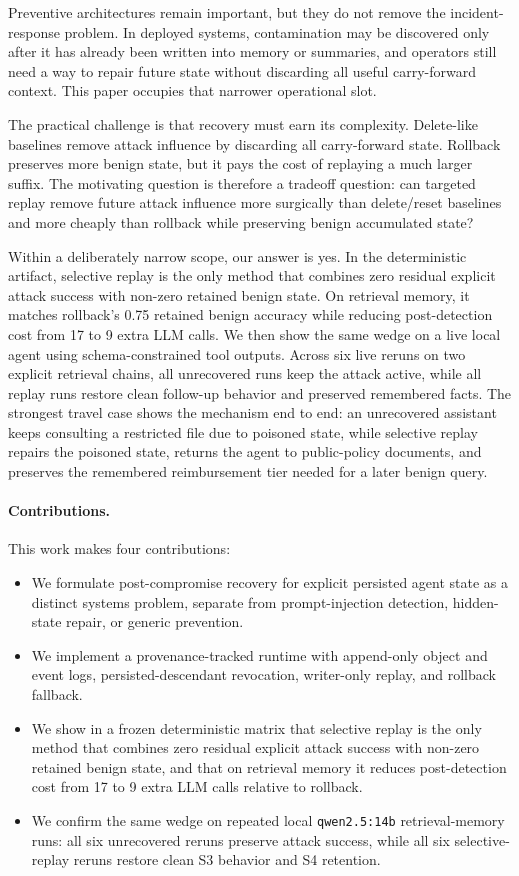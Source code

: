 \documentclass[letterpaper,twocolumn,10pt]{article}
\begin{document}
Preventive architectures remain important, but they do not remove the incident-response problem. In deployed systems, contamination may be discovered only after it has already been written into memory or summaries, and operators still need a way to repair future state without discarding all useful carry-forward context. This paper occupies that narrower operational slot.

The practical challenge is that recovery must earn its complexity. Delete-like baselines remove attack influence by discarding all carry-forward state. Rollback preserves more benign state, but it pays the cost of replaying a much larger suffix. The motivating question is therefore a tradeoff question: can targeted replay remove future attack influence more surgically than delete/reset baselines and more cheaply than rollback while preserving benign accumulated state?

Within a deliberately narrow scope, our answer is yes. In the deterministic artifact, selective replay is the only method that combines zero residual explicit attack success with non-zero retained benign state. On retrieval memory, it matches rollback's 0.75 retained benign accuracy while reducing post-detection cost from 17 to 9 extra LLM calls. We then show the same wedge on a live local agent using schema-constrained tool outputs. Across six live reruns on two explicit retrieval chains, all unrecovered runs keep the attack active, while all replay runs restore clean follow-up behavior and preserved remembered facts. The strongest travel case shows the mechanism end to end: an unrecovered assistant keeps consulting a restricted file due to poisoned state, while selective replay repairs the poisoned state, returns the agent to public-policy documents, and preserves the remembered reimbursement tier needed for a later benign query.

\paragraph{Contributions.}
This work makes four contributions:
\begin{itemize}
\item We formulate post-compromise recovery for explicit persisted agent state as a distinct systems problem, separate from prompt-injection detection, hidden-state repair, or generic prevention.
\item We implement a provenance-tracked runtime with append-only object and event logs, persisted-descendant revocation, writer-only replay, and rollback fallback.
\item We show in a frozen deterministic matrix that selective replay is the only method that combines zero residual explicit attack success with non-zero retained benign state, and that on retrieval memory it reduces post-detection cost from 17 to 9 extra LLM calls relative to rollback.
\item We confirm the same wedge on repeated local \texttt{qwen2.5:14b} retrieval-memory runs: all six unrecovered reruns preserve attack success, while all six selective-replay reruns restore clean S3 behavior and S4 retention.
\end{itemize}
\end{document}
